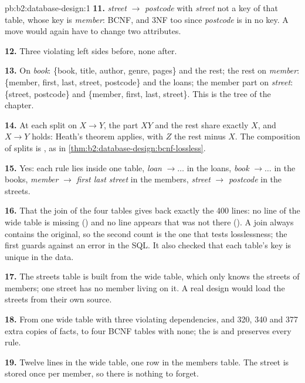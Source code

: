 \begin{solution}{pb:b2:database-design:1}
\textbf{11.} \emph{street} $\to$ \emph{postcode} with \emph{street} not a key of that table, whose key is \emph{member}:
BCNF, and 3NF too since \emph{postcode} is in no key. A move would again have to change two attributes.

\textbf{12.} Three violating left sides before, none after.

\textbf{13.} On \emph{book}: \{book, title, author, genre, pages\} and the rest; the rest on \emph{member}: \{member, first,
last, street, postcode\} and the loans; the member part on \emph{street}: \{street, postcode\} and \{member, first, last,
street\}. This is the  tree of the chapter.

\textbf{14.} At each split on $X \to Y$, the part $XY$ and the rest share exactly $X$, and $X \to Y$ holds: Heath's
theorem applies, with $Z$ the rest minus $X$. The composition of  splits is , as in
\cref{thm:b2:database-design:bcnf-lossless}.

\textbf{15.} Yes: each rule lies inside one table, \emph{loan} $\to \dots$ in the loans, \emph{book} $\to \dots$ in the
books, \emph{member} $\to$ \emph{first last street} in the members, \emph{street} $\to$ \emph{postcode} in the streets.

\textbf{16.} That the join of the four tables gives back exactly the 400 lines: no line of the wide table is missing
() and no line appears that was not there (). A join always contains the original, so the
second count is the one that tests losslessness; the first guards against an error in the SQL. It also checked that each
table's key is unique in the data.

\textbf{17.} The streets table is built from the wide table, which only knows the streets of members; one street has no
member living on it. A real design would load the streets from their own source.

\textbf{18.} From one wide table with three violating dependencies, and 320, 340 and 377 extra copies of facts, to four
BCNF tables with none; the  is  and preserves every rule.

\textbf{19.} Twelve lines in the wide table, one row in the members table. The street is stored once per member, so
there is nothing to forget.


\end{solution}
